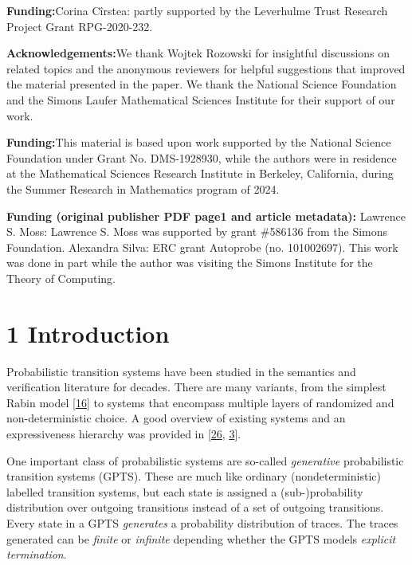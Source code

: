 \documentclass[11pt,a4paper]{amsart}
\begin{document}
 \par\noindent\textbf{Funding:}\quad Corina Cîrstea: partly supported by the Leverhulme Trust Research Project Grant RPG-2020-232. 
 \par\noindent\textbf{Acknowledgements:}\quad We thank Wojtek Rozowski for insightful discussions on related topics and the anonymous reviewers for helpful suggestions that improved the material presented in the paper. We thank the National Science Foundation and the Simons Laufer Mathematical Sciences Institute for their support of our work. 
 \par\noindent\textbf{Funding:}\quad This material is based upon work supported by the National Science Foundation under Grant No. DMS-1928930, while the authors were in residence at the Mathematical Sciences Research Institute in Berkeley, California, during the Summer Research in Mathematics program of 2024. 
%
\par\noindent\textbf{Funding (original publisher PDF page1 and article metadata):} Lawrence S. Moss: Lawrence S. Moss was supported by grant \#586136 from the Simons Foundation. Alexandra Silva: ERC grant Autoprobe (no. 101002697). This work was done in part while the author was visiting the Simons Institute for the Theory of Computing.\par\medskip
\hypertarget{html:S1}{} \section*{1 Introduction}
\hypertarget{html:S1.p1}{} Probabilistic transition systems have been studied in the semantics and verification literature for decades. There are many variants, from the simplest Rabin model [\hyperlink{html:bib.bib16}{16}] to systems that encompass multiple layers of randomized and non-deterministic choice. A good overview of existing systems and an expressiveness hierarchy was provided in [\hyperlink{html:bib.bib26}{26}, \hyperlink{html:bib.bib3}{3}].
\par\medskip
\hypertarget{html:S1.p2}{} One important class of probabilistic systems are so-called \emph{generative} probabilistic transition systems (GPTS). These are much like ordinary (nondeterministic) labelled transition systems, but each state is assigned a (sub-)probability distribution over outgoing transitions instead of a set of outgoing transitions. Every state in a GPTS \emph{generates} a probability distribution of traces. The traces generated can be \emph{finite} or \emph{infinite} depending whether the GPTS models \emph{explicit termination}.
\end{document}
